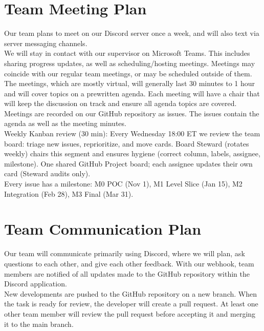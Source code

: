 \documentclass{article}
\begin{document}
\section{Team Meeting Plan}


Our team plans to meet on our Discord server once a week, and will also text via server messaging channels. \\

We will stay in contact with our supervisor on Microsoft Teams. This includes sharing progress updates, as well as scheduling/hosting meetings. Meetings may coincide with our regular team meetings, or may be scheduled outside of them.\\

The meetings, which are mostly virtual, will generally last 30 minutes to 1 hour and will cover topics on a prewritten agenda. Each meeting will have a chair that will keep the discussion on track and ensure all agenda topics are covered.\\

Meetings are recorded on our GitHub repository as issues. The issues contain the agenda as well as the meeting minutes.\\

Weekly Kanban review (30 min): Every Wednesday 18:00 ET we review the team board: triage new issues, reprioritize, and move cards. Board Steward (rotates weekly) chairs this segment and ensures hygiene (correct column, labels, assignee, milestone).
One shared GitHub Project board; each assignee updates their own card (Steward audits only).\\

Every issue has a milestone: M0 POC (Nov 1), M1 Level Slice (Jan 15), M2 Integration (Feb 28), M3 Final (Mar 31).\\

\section{Team Communication Plan}

Our team will communicate primarily using Discord, where we will plan, ask questions to each other, and give each other feedback. With our webhook, team members are notified of all updates made to the GitHub repository within the Discord application.\\

New developments are pushed to the GitHub repository on a new branch. When the task is ready for review, the developer will create a pull request. At least one other team member will review the pull request before accepting it and merging it to the main branch.\\
\end{document}
